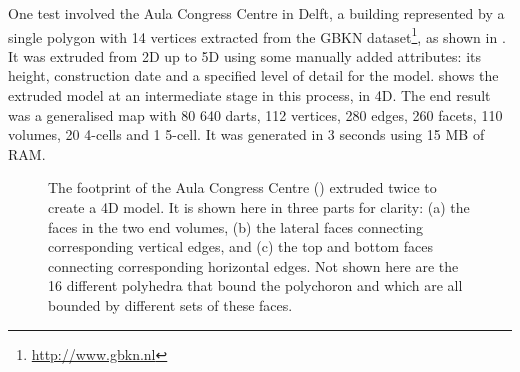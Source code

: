 One test involved the Aula Congress Centre in Delft, a building represented by a single polygon with 14 vertices extracted from the GBKN dataset\footnote{\url{http://www.gbkn.nl}}, as shown in .
It was extruded from 2D up to 5D using some manually added attributes: its height, construction date and a specified level of detail for the model.
 shows the extruded model at an intermediate stage in this process, in 4D.
The end result was a generalised map with 80 640 darts, 112 vertices, 280 edges, 260 facets, 110 volumes, 20 4-cells and 1 5-cell.
It was generated in 3 seconds using 15 MB of RAM.\@
\begin{figure}[b]
\centering
{}
{}
{}
\caption[Extruding the footprint of the Aula Congress Centre in Delft to 4D]{The footprint of the Aula Congress Centre () extruded twice to create a 4D model.
It is shown here in three parts for clarity: (a) the faces in the two end volumes, (b) the lateral faces connecting corresponding vertical edges, and (c) the top and bottom faces connecting corresponding horizontal edges.
Not shown here are the 16 different polyhedra that bound the polychoron and which are all bounded by different sets of these faces.}
\label{fig:aula4d}
\end{figure}

